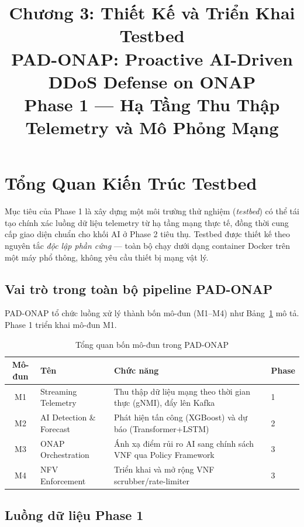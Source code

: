 \documentclass[12pt,a4paper]{article}
\title{\textbf{Chương 3: Thiết Kế và Triển Khai Testbed}\\[0.4em]
\large PAD-ONAP: Proactive AI-Driven DDoS Defense on ONAP\\[0.3em]
\normalsize Phase 1 --- Hạ Tầng Thu Thập Telemetry và Mô Phỏng Mạng}
\author{}
\date{}
\begin{document}
\maketitle
\tableofcontents
\newpage

\section{Tổng Quan Kiến Trúc Testbed}

Mục tiêu của Phase 1 là xây dựng một môi trường thử nghiệm (\textit{testbed}) có thể tái tạo chính xác luồng dữ liệu telemetry từ hạ tầng mạng thực tế, đồng thời cung cấp giao diện chuẩn cho khối AI ở Phase 2 tiêu thụ. Testbed được thiết kế theo nguyên tắc \textit{độc lập phần cứng} --- toàn bộ chạy dưới dạng container Docker trên một máy phổ thông, không yêu cầu thiết bị mạng vật lý.

\subsection{Vai trò trong toàn bộ pipeline PAD-ONAP}

PAD-ONAP tổ chức luồng xử lý thành bốn mô-đun (M1--M4) như Bảng~\ref{tab:pipeline_overview} mô tả. Phase 1 triển khai mô-đun M1.

\begin{table}[H]
\centering
\caption{Tổng quan bốn mô-đun trong PAD-ONAP}
\label{tab:pipeline_overview}
\begin{tabular}{clp{7cm}l}
\toprule
\textbf{Mô-đun} & \textbf{Tên} & \textbf{Chức năng} & \textbf{Phase} \\
\midrule
M1 & Streaming Telemetry  & Thu thập dữ liệu mạng theo thời gian thực (gNMI), đẩy lên Kafka & 1 \\
M2 & AI Detection \& Forecast & Phát hiện tấn công (XGBoost) và dự báo (Transformer+LSTM) & 2 \\
M3 & ONAP Orchestration & Ánh xạ điểm rủi ro AI sang chính sách VNF qua Policy Framework & 3 \\
M4 & NFV Enforcement    & Triển khai và mở rộng VNF scrubber/rate-limiter & 3 \\
\bottomrule
\end{tabular}
\end{table}

\subsection{Luồng dữ liệu Phase 1}
\end{document}

